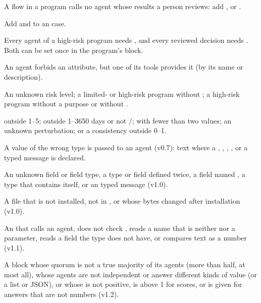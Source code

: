 A flow in a  program calls no agent whose results a person reviews: add ,  or .

Add  and  to an  case.

Every agent of a high-risk program needs , and every reviewed decision needs . Both can be set once in the program's  block.

An agent forbids an attribute, but one of its tools provides it (by its name or description).

An unknown risk level; a limited- or high-risk program without ; a high-risk program without a purpose or without .

 outside 1--5;  outside 1--3650 days or not /;  with fewer than two values; an unknown perturbation; or a consistency outside 0--1.

A value of the wrong type is passed to an agent (v0.7): text where a , , , ,  or a typed message is declared.

An unknown field or field type, a type or field defined twice, a field named , a type that contains itself, or an  typed message (v1.0).

A  file that is not installed, not in , or whose bytes changed after installation (v1.0).

An  that calls an agent, does not check , reads a name that is neither  nor a parameter, reads a field the type does not have, or compares text as a number (v1.1).

A  block whose quorum is not a true majority of its agents (more than half, at most all), whose agents are not independent or answer different kinds of value (or a list or JSON), or whose  is not positive, is above 1 for scores, or is given for answers that are not numbers (v1.2).

